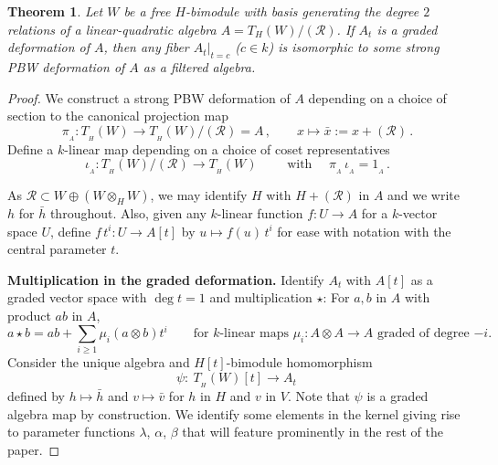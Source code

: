 \documentclass[11pt]{amsart}
\numberwithin{equation}{section}
\newtheorem{thm}[equation]{Theorem}
\newcommand{\sA}{A }
\newcommand{\RR}{\mathscr{R} }
\renewcommand{\_}[1]{\mbox{$_{\left( #1 \right)}$}}
\newcommand{\ot}{\otimes}
\newcommand{\Ho}{H}%
\begin{document}
{\vspace{1ex}

\begin{thm}\label{DeformationImpliesPBW}
  Let $W$ be a free $H$-bimodule with basis generating the degree $2$
  relations of a linear-quadratic algebra $\sA=T_{H}(W)/(\RR)$.
If $\sA_t$ is a graded deformation
of $\sA$, then 
any fiber  $\sA_t|_{t=c}$  ($c\in k$)
  is isomorphic to some strong PBW deformation 
  of $\sA$
  as a filtered algebra.
\end{thm}
\begin{proof}
   We construct a strong PBW deformation of $\sA$
  depending on a choice of section
  to the canonical projection map
  $$\pi_{_\sA}:T_{\! _H}(W)\rightarrow T_{\! _H}(W)/(\RR)=\sA\, ,
  \qquad x\longmapsto \bar{x}:=x+(\RR)
  \, .
  $$
  Define a $k$-linear map depending on a choice of 
 coset representatives
  \begin{equation}\label{section}
    \iota_{_\sA}  : T_{\! _H}(W)/(\RR) \longrightarrow T_{\! _H}(W) 
  \qquad\text{ with }\quad \pi_{_\sA}\, \iota_{_\sA} = 1_{_\sA}\, .
  \end{equation}
    
As $\RR\subset W\oplus (W\ot_H W)$,
we may identify $H$ with $H+(\RR)$ in $\sA$
and we write $h$ for $\bar h$ throughout.
Also, given
any $k$-linear function $f:U\rightarrow \sA$
for a  $k$-vector space $U$,
define $f\, t^i: U\rightarrow \sA[t]$ 
by $u\mapsto f(u)\, t^i$
for ease with notation with the central parameter $t$.

   
{\bf Multiplication in the graded deformation.}
  Identify $\sA_t$ with $\sA[t]$ as a graded vector space
  with $\deg t=1$ and multiplication $\star$:  For $a,b$ in $\sA$
  with product $ab$ in $\sA$,
\begin{equation}\label{eqn:star-product}
  a\star b=ab + \sum_{i\geq 1} \mu_i(a\ot b)t^i
  \qquad
  \text{for $k$-linear maps $\mu_i:\sA\ot \sA\rightarrow \sA$ graded of degree
    $-i$.}
\end{equation}
  Consider the unique algebra and $\Ho[t]$-bimodule homomorphism
  \begin{equation}
    \label{PsiDef}
    \psi:\
    T_{\! _H}(W)[t] \longrightarrow \sA_t\,
   \end{equation}
  defined by $h\mapsto \bar h$ and
$v\mapsto \bar v$
for $h$ in $\Ho$ and $v$ in $V$.
Note that $\psi$ is a graded algebra map by construction.
We identify some elements in the kernel giving rise to parameter functions
$\lambda$, $\alpha$, $\beta$
that will feature prominently in the rest of the paper.



\end{proof}}
\end{document}
